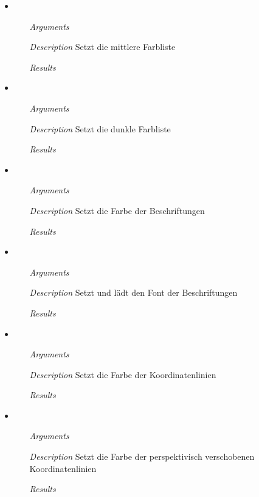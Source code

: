 \begin{itemize}
\item {}
\begin{enumerate}
\item[\textit{Arguments}] 
\item[\textit{Description}] Setzt die mittlere Farbliste
\item[\textit{Results}] 
\end{enumerate}

\item {}
\begin{enumerate}
\item[\textit{Arguments}] 
\item[\textit{Description}] Setzt die dunkle Farbliste
\item[\textit{Results}] 
\end{enumerate}

\item {}
\begin{enumerate}
\item[\textit{Arguments}] 
\item[\textit{Description}] Setzt die Farbe der Beschriftungen
\item[\textit{Results}] 
\end{enumerate}

\item {}
\begin{enumerate}
\item[\textit{Arguments}] 
\item[\textit{Description}] Setzt und l\"adt den Font der
  Beschriftungen
\item[\textit{Results}] 
\end{enumerate}

\item {}
\begin{enumerate}
\item[\textit{Arguments}] 
\item[\textit{Description}] Setzt die Farbe der Koordinatenlinien
\item[\textit{Results}] 
\end{enumerate}

\item {}
\begin{enumerate}
\item[\textit{Arguments}] 
\item[\textit{Description}] Setzt die Farbe der perspektivisch
  verschobenen Koordinatenlinien
\item[\textit{Results}] 
\end{enumerate}


\end{itemize}
